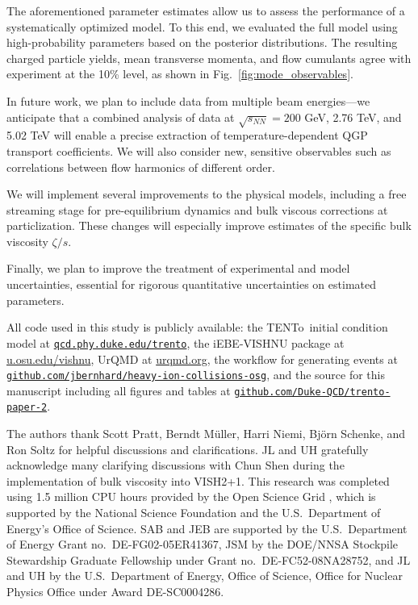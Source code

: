 \documentclass[aps,prc,reprint,amsmath,nofootinbib,noeprint]{revtex4-1}
\newcommand{\trento}{T\raisebox{-0.5ex}{R}ENTo}
\newcommand{\sqrts}{\sqrt{s_{NN}}}
\begin{document}
The aforementioned parameter estimates allow us to assess the performance of a systematically optimized model.
To this end, we evaluated the full model using high-probability parameters based on the posterior distributions.
The resulting charged particle yields, mean transverse momenta, and flow cumulants agree with experiment at the 10\% level, as shown in Fig.~\ref{fig:mode_observables}.

In future work, we plan to include data from multiple beam energies---we anticipate that a combined analysis of data at $\sqrts = 200$ GeV, 2.76 TeV, and 5.02 TeV will enable a precise extraction of temperature-dependent QGP transport coefficients.
We will also consider new, sensitive observables such as correlations between flow harmonics of different order.

We will implement several improvements to the physical models, including a free streaming stage for pre-equilibrium dynamics and bulk viscous corrections at particlization.
These changes will especially improve estimates of the specific bulk viscosity $\zeta/s$.

Finally, we plan to improve the treatment of experimental and model uncertainties, essential for rigorous quantitative uncertainties on estimated parameters.

\vspace*{\baselineskip}

\newcommand{\nicelink}[2][http]{\mbox{\href{#1://#2}{\nolinkurl{#2}}}}

All code used in this study is publicly available:
the \trento\ initial condition model at \nicelink{qcd.phy.duke.edu/trento},
the iEBE-VISHNU package at \url{u.osu.edu/vishnu},
UrQMD at \url{urqmd.org},
the workflow for generating events at \nicelink[https]{github.com/jbernhard/heavy-ion-collisions-osg},
and the source for this manuscript including all figures and tables at \nicelink[https]{github.com/Duke-QCD/trento-paper-2}.

\begin{acknowledgments}
The authors thank Scott Pratt, Berndt M\"uller, Harri Niemi, Bj\"orn Schenke, and Ron Soltz for helpful discussions and clarifications.
JL and UH gratefully acknowledge many clarifying discussions with Chun Shen during the implementation of bulk viscosity into VISH2+1.
This research was completed using 1.5 million CPU hours provided by the Open Science Grid \cite{Pordes:2007zzb,Sfiligoi:2010zz}, which is supported by the National Science Foundation and the U.S.\ Department of Energy's Office of Science.
SAB and JEB are supported by the U.S.\ Department of Energy Grant no.~DE-FG02-05ER41367,
JSM by the DOE/NNSA Stockpile Stewardship Graduate Fellowship under Grant no.~DE-FC52-08NA28752,
and JL and UH by the U.S.\ Department of Energy, Office of Science, Office for Nuclear Physics Office under Award DE-SC0004286.
\end{acknowledgments}


\end{document}

